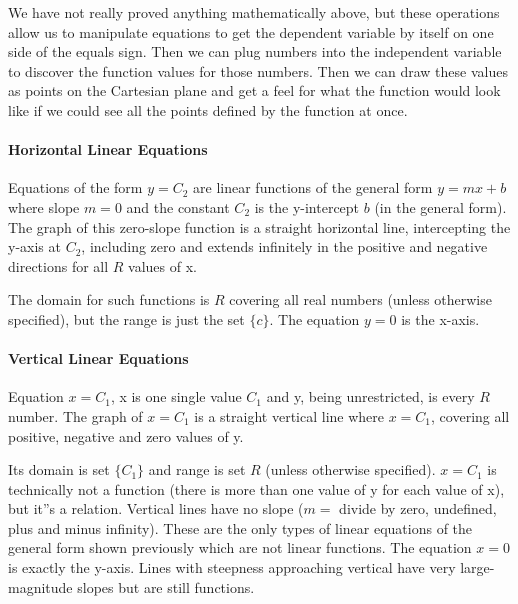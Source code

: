 We have not really proved anything mathematically above, but these operations allow us to manipulate equations to get the dependent variable by itself on one side of the equals sign. Then we can plug numbers into the independent variable to discover the function values for those numbers. Then we can draw these values as points on the Cartesian plane and get a feel for what the function would look like if we could see all the points defined by the function at once.



\paragraph{Horizontal Linear Equations}



Equations of the form $y = C_2$ are linear functions of the general form $y = mx + b$ where slope $m = 0$ and the constant $C_2$ is the y-intercept $b$ (in the general form). The graph of this zero-slope function is a straight horizontal line, intercepting the y-axis at $C_2$, including zero and extends infinitely in the positive and negative directions for all $R$ values of x.






The domain for such functions is $R$ covering all real numbers (unless otherwise specified), but the range is just the set $\{ c \}$. The equation $y = 0$ is the x-axis.



\paragraph{Vertical Linear Equations}



Equation $x = C_1$, x is one single value $C_1$ and y, being unrestricted, is every $R$ number. The graph of $x = C_1$ is a straight vertical line where $x = C_1$, covering all positive, negative and zero values of y.






Its domain is set $\{ C_1 \}$ and range is set $R$ (unless otherwise specified). $x = C_1$ is technically not a function (there is more than one value of y for each value of x), but it''s a relation. Vertical lines have no slope ($m =$ divide by zero, undefined, plus and minus infinity). These are the only types of linear equations of the general form shown previously which are not linear functions. The equation $x = 0$ is exactly the y-axis. Lines with steepness approaching vertical have very large-magnitude slopes but are still functions.



